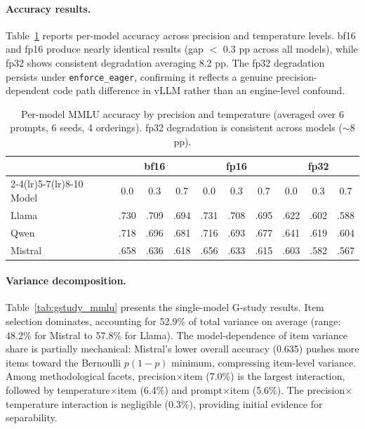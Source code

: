 \documentclass[letterpaper,11pt]{article}
\begin{document}
\paragraph{Accuracy results.}
Table~\ref{tab:accuracy_mmlu} reports per-model accuracy across precision and temperature levels.
bf16 and fp16 produce nearly identical results (gap $<$ 0.3 pp across all models), while fp32 shows consistent degradation averaging 8.2 pp.
The fp32 degradation persists under \texttt{enforce\_eager}, confirming it reflects a genuine precision-dependent code path difference in vLLM rather than an engine-level confound.

\begin{table}[t]
\centering
\caption{Per-model MMLU accuracy by precision and temperature (averaged over 6 prompts, 6 seeds, 4 orderings). fp32 degradation is consistent across models ($\sim$8 pp).}
\label{tab:accuracy_mmlu}
\small
\begin{tabular}{@{}l ccc ccc ccc@{}}
\toprule
& \multicolumn{3}{c}{bf16} & \multicolumn{3}{c}{fp16} & \multicolumn{3}{c}{fp32} \\
\cmidrule(lr){2-4}\cmidrule(lr){5-7}\cmidrule(lr){8-10}
Model & 0.0 & 0.3 & 0.7 & 0.0 & 0.3 & 0.7 & 0.0 & 0.3 & 0.7 \\
\midrule
Llama   & .730 & .709 & .694 & .731 & .708 & .695 & .622 & .602 & .588 \\
Qwen    & .718 & .696 & .681 & .716 & .693 & .677 & .641 & .619 & .604 \\
Mistral & .658 & .636 & .618 & .656 & .633 & .615 & .603 & .582 & .567 \\
\bottomrule
\end{tabular}
\end{table}

\paragraph{Variance decomposition.}
Table~\ref{tab:gstudy_mmlu} presents the single-model G-study results.
Item selection dominates, accounting for 52.9\% of total variance on average (range: 48.2\% for Mistral to 57.8\% for Llama).
The model-dependence of item variance share is partially mechanical: Mistral's lower overall accuracy (0.635) pushes more items toward the Bernoulli $p(1-p)$ minimum, compressing item-level variance.
Among methodological facets, precision$\times$item (7.0\%) is the largest interaction, followed by temperature$\times$item (6.4\%) and prompt$\times$item (5.6\%).
The precision$\times$temperature interaction is negligible (0.3\%), providing initial evidence for separability.
\end{document}
